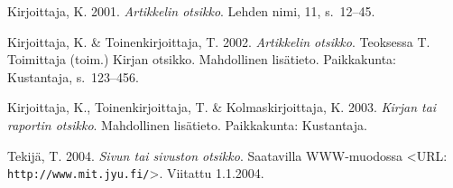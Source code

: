 \documentclass[utf8,bachelor,manualbib]{gradu3}
\begin{document}
\begin{thebibliography}{} 


Kirjoittaja, K. 2001. \textit{Artikkelin otsikko}. Lehden nimi, 11, s.~12--45.


Kirjoittaja, K. \& Toinenkirjoittaja, T. 2002.
\textit{Artikkelin otsikko}. Teoksessa T. Toimittaja (toim.) Kirjan otsikko.
Mahdollinen lisätieto. Paikkakunta: Kustantaja, s.~123--456.

Kirjoittaja, K., Toinenkirjoittaja, T. \& Kolmaskirjoittaja, K. 2003.
\textit{Kirjan tai raportin otsikko}. Mahdollinen lisätieto.
Paikkakunta: Kustantaja.

Tekijä, T. 2004. \textit{Sivun tai sivuston otsikko}. Saatavilla WWW-muodossa
<URL: \texttt{http://www.mit.jyu.fi/}>. Viitattu 1.1.2004.


\end{thebibliography}
\end{document}
